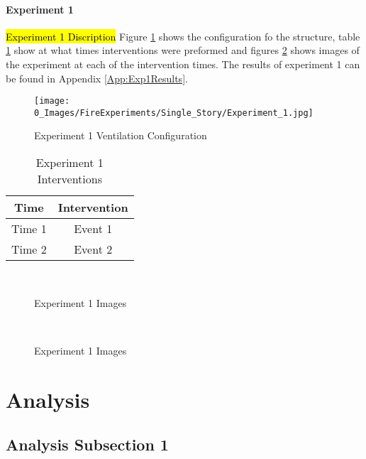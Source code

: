 \documentclass{article}
\begin{document}
\paragraph{Experiment 1} \mbox{}

\hl{Experiment 1 Discription} Figure \ref{fig:Exp1VentConfig} shows the configuration fo the structure, table \ref{Table:Exp1Interventions} show at what times interventions were preformed and figures \ref{fig:Experiment1Images} shows images of the experiment at each of the intervention times. The results of experiment 1 can be found in Appendix \ref{App:Exp1Results}.

\begin{figure}[h!]
	\centering
	\texttt{[image: 0\_Images/FireExperiments/Single\_Story/Experiment\_1.jpg]}
	\caption{Experiment 1 Ventilation Configuration}
	\label{fig:Exp1VentConfig}
\end{figure}

\begin{table}[H]
	\centering
	\caption{Experiment 1 Interventions}
	\begin{tabular}{|c|c|} 
		\hline
		Time & Intervention \\ \hline \hline
		Time 1 & Event 1 \\ \hline
		Time 2 & Event 2 \\ \hline
	\end{tabular}
	\label{Table:Exp1Interventions}
\end{table}

\clearpage

\begin{figure}[H]
	\centering 
	\subfloat[Event 1]{} \ 
	\subfloat[Event 2]{} \ 
	\subfloat[Event 3]{} \ 
	\caption{Experiment 1 Images}
	\label{fig:Experiment1Images} 
\end{figure}

\clearpage

\begin{figure}[H]
	\ContinuedFloat 
	\centering 
	\subfloat[Event 4]{} \ 
	\subfloat[Event 5]{} \ 
	\subfloat[Event 6]{} \ 
	\caption{Experiment 1 Images}
	\label{fig:Experiment1ImagesCont} 
\end{figure}

\clearpage

\section{Analysis}

\subsection{Analysis Subsection 1}
\end{document}
